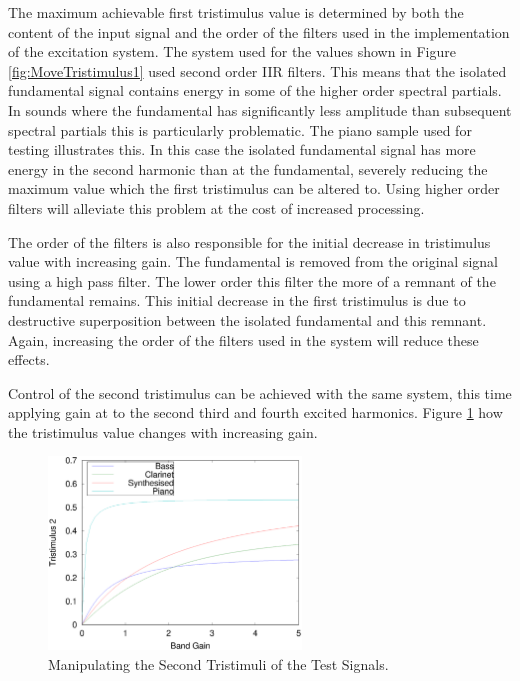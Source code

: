 			The maximum achievable first tristimulus value is determined by both the content of the input
			signal and the order of the filters used in the implementation of the excitation system. The system
			used for the values shown in Figure \ref{fig:MoveTristimulus1} used second order IIR filters. This
			means that the isolated fundamental signal contains energy in some of the higher order spectral
			partials. In sounds where the fundamental has significantly less amplitude than subsequent spectral
			partials this is particularly problematic. The piano sample used for testing illustrates this. In
			this case the isolated fundamental signal has more energy in the second harmonic than at the
			fundamental, severely reducing the maximum value which the first tristimulus can be altered to.
			Using higher order filters will alleviate this problem at the cost of increased processing.

			The order of the filters is also responsible for the initial decrease in tristimulus value with
			increasing gain. The fundamental is removed from the original signal using a high pass filter. The
			lower order this filter the more of a remnant of the fundamental remains. This initial decrease in
			the first tristimulus is due to destructive superposition between the isolated fundamental and this
			remnant. Again, increasing the order of the filters used in the system will reduce these effects.

			Control of the second tristimulus can be achieved with the same system, this time applying gain at
			to the second third and fourth excited harmonics. Figure \ref{fig:MoveTristimulus2} how the
			tristimulus value changes with increasing gain.

			\begin{figure}[h!]
				\centering
				\includegraphics[width=0.6\textwidth]{chapter6/Images/MoveTristimulus2.eps}
				\caption{Manipulating the Second Tristimuli of the Test Signals.}
				\label{fig:MoveTristimulus2}
			\end{figure}

